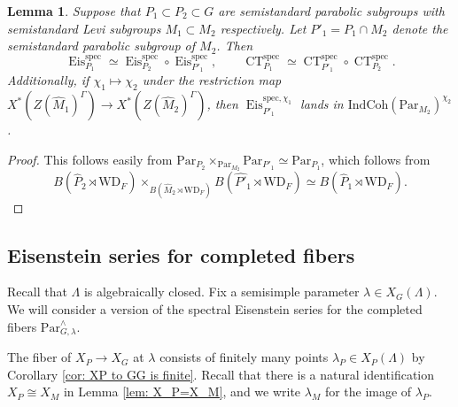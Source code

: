 \documentclass{amsart}
\newtheorem{lemma}[theorem]{Lemma}
\theoremstyle{definition}
\theoremstyle{remark}
\numberwithin{equation}{section}
\newcommand{\spec}{\mathrm{spec}}
\newcommand{\wh}{\widehat}
\newcommand{\Par}{\mathrm{Par}}
\newcommand{\IndCoh}{\mathrm{IndCoh}}
\DeclareMathOperator{\Eis}{\mathrm{Eis}}
\DeclareMathOperator{\CT}{\mathrm{CT}}
\newcommand{\WD}{\mathrm{WD}}
\begin{document}
\begin{lemma}{\label{lem: eisctcompositions}}
Suppose that $P_1 \subset P_2 \subset G$ are semistandard parabolic subgroups with semistandard Levi subgroups $M_1\subset M_2$ respectively. Let $P'_1 = P_1 \cap M_2$ denote the semistandard parabolic subgroup of $M_2$. Then 
\begin{equation*}
    \Eis^{\spec}_{P_1} \simeq \Eis^{\spec}_{P_2} \circ \Eis^{\spec}_{P'_1}, \qquad \CT^{\spec}_{P_1} \simeq \CT^{\spec}_{P'_1} \circ \CT^{\spec}_{P_2}.
\end{equation*}
Additionally, if $\chi_1 \mapsto \chi_2$ under the restriction map $X^{\ast}(Z(\wh{M}_1)^{\Gamma}) \rightarrow X^{\ast}(Z(\wh{M}_2)^{\Gamma})$, then $\Eis^{\spec, \chi_1}_{P'_1}$ lands in $\IndCoh(\Par_{M_2})^{\chi_2}$.
\end{lemma}

\begin{proof}
This follows easily from $\Par_{P_2}\times_{\Par_{M_2}}\Par_{P'_1}\simeq \Par_{P_1}$, which follows from 
\[
B(\wh{P}_2\rtimes \WD_F)\times_{B(\wh{M}_2\rtimes \WD_F)} B(\wh{P'}_1\rtimes \WD_F) \simeq B(\wh{P}_1\rtimes \WD_F). 
\]
\end{proof}

\subsection{Eisenstein series for completed fibers}
Recall that $\Lambda$ is algebraically closed. Fix a semisimple parameter $\lambda\in X_G(\Lambda)$. We will consider a version of the spectral Eisenstein series for the completed fibers $\Par_{G,\lambda}^{\wedge}$. 

The fiber of $X_P\to X_G$ at $\lambda$ consists of finitely many points $\lambda_P \in X_P (\Lambda)$ by Corollary \ref{cor: XP to GG is finite}. Recall that there is a natural identification $X_P \cong X_M$ in Lemma \ref{lem: X_P=X_M}, and we write $\lambda_M$ for the image of $\lambda_P$. 
\end{document}
